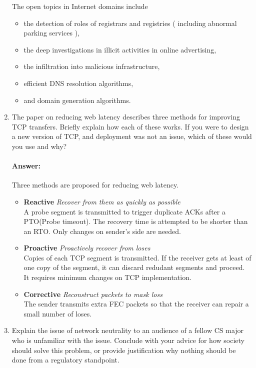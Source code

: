 \documentclass[a4paper,11pt]{article}
\theoremstyle{mytheor}
\begin{document}
\begin{enumerate}
The open topics in Internet domains include
\begin{itemize}
\item the detection of roles of registrars and registries ( including abnormal parking services ),
\item the deep investigations in illicit activities in online advertising,
\item the infiltration into malicious infrastructure,
\item efficient DNS resolution algorithms,
\item and domain generation algorithms.
\end{itemize}
\begin{comment}
\item 
The paper on SSL, HTTPS, and trust models describes a number of flaws with our system for secure communication. 
Choose three of these you feel are most important. 
Describe the aw and explain why this is a critical area where improvement is needed.
\paragraph{Answer:}
xx
\end{comment}

\item
The paper on reducing web latency describes three methods for improving TCP transfers. 
Briefly explain how each of these works. 
If you were to design a new version of TCP, and deployment was not an issue, which of these would you use and why?
\paragraph{Answer:}
Three methods are proposed for reducing web latency.
\begin{itemize}
\item \textbf{Reactive} \emph{Recover from them as quickly as possible} \\
A probe segment is transmitted to trigger duplicate ACKs after a PTO(Probe timeout).
The recovery time is attempted to be shorter than an RTO.
Only changes on sender's side are needed.
\item \textbf{Proactive} \emph{Proactively recover from loses} \\
Copies of each TCP segment is transmitted.
If the receiver gets at least of one copy of the segment, it can discard redudant segments and proceed.
It requires minimum changes on TCP implementation.
\item \textbf{Corrective} \emph{Reconstruct packets to mask loss} \\
The sender transmits extra FEC packets so that the receiver can repair a small number of loses.
\end{itemize}
\item
Explain the issue of network neutrality to an audience of a fellow CS major who is unfamiliar with the issue.
Conclude with your advice for how society should solve this problem, or provide justification why nothing should be done from a regulatory standpoint.

\end{enumerate}
\end{document}

